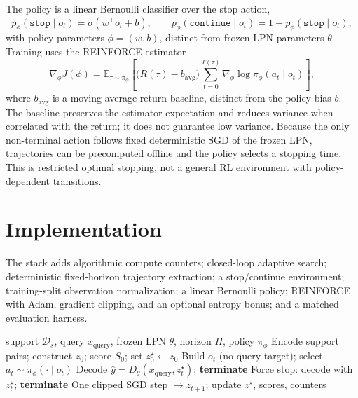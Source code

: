 \documentclass[11pt,a4paper]{article}
\begin{document}
The policy is a linear Bernoulli classifier over the stop action,
\begin{equation}
p_\phi(\texttt{stop}\mid o_t)=\sigma(w^\top o_t+b),\qquad
p_\phi(\texttt{continue}\mid o_t)=1-p_\phi(\texttt{stop}\mid o_t),
\end{equation}
with policy parameters $\phi=(w,b)$, distinct from frozen LPN parameters
$\theta$.
Training uses the REINFORCE estimator~\cite{williams1992reinforce}
\begin{equation}
\nabla_\phi J(\phi)
=
\mathbb{E}_{\tau\sim\pi_\phi}
\!\left[
\bigl(R(\tau)-b_{\mathrm{avg}}\bigr)
\sum_{t=0}^{T(\tau)}
\nabla_\phi\log\pi_\phi(a_t\mid o_t)
\right],
\end{equation}
where $b_{\mathrm{avg}}$ is a moving-average return baseline, distinct from the
policy bias $b$.
The baseline preserves the estimator expectation and reduces variance when
correlated with the return; it does not guarantee low variance.
Because the only non-terminal action follows fixed deterministic SGD of the
frozen LPN, trajectories can be precomputed offline and the policy selects a
stopping time.
This is restricted optimal stopping, not a general RL environment with
policy-dependent transitions.

\section{Implementation}

The stack adds algorithmic compute counters; closed-loop adaptive search;
deterministic fixed-horizon trajectory extraction; a stop/continue environment;
training-split observation normalization; a linear Bernoulli policy; REINFORCE
with Adam, gradient clipping, and an optional entropy bonus; and a matched
evaluation harness.

\begin{algorithm}[H]
\caption{RL-controlled latent search}
\label{alg:rlsearch}
\small
\begin{algorithmic}[1]
\Input support $\mathcal{D}_s$, query $x_{\mathrm{query}}$, frozen LPN $\theta$, horizon $H$, policy $\pi_\phi$
\State Encode support pairs; construct $z_0$; score $S_0$; set $z_0^\star\!\leftarrow\!z_0$
  \State Build $o_t$ (no query target); select $a_t\sim\pi_\phi(\cdot\mid o_t)$
    \State Decode $\widehat{y}=D_\theta(x_{\mathrm{query}},z_t^\star)$; \textbf{terminate}
    \State Force stop: decode with $z_t^\star$; \textbf{terminate}
  \Else
    \State One clipped SGD step $\to z_{t+1}$; update $z^\star$, scores, counters
  \EndIf
\EndFor
\end{algorithmic}
\end{algorithm}
\end{document}
